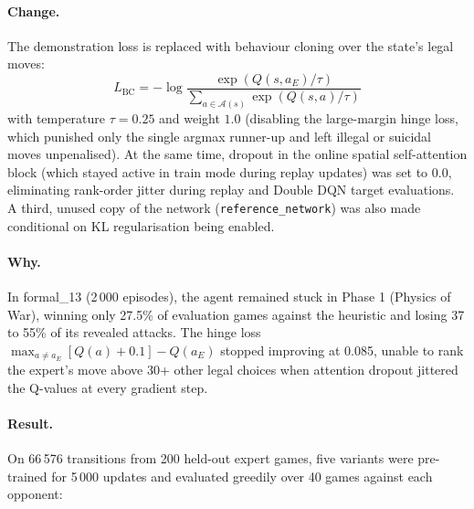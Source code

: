 \paragraph{Change.} The demonstration loss is replaced with behaviour cloning over the state's
legal moves:
\[
L_{\text{BC}} = -\log \frac{\exp(Q(s, a_E) / \tau)}{\sum_{a \in \mathcal{A}(s)} \exp(Q(s, a) / \tau)}
\]
with temperature $\tau = 0.25$ and weight $1.0$ (disabling the large-margin hinge loss, which
punished only the single argmax runner-up and left illegal or suicidal moves unpenalised). At the
same time, dropout in the online spatial self-attention block (which stayed active in train mode
during replay updates) was set to $0.0$, eliminating rank-order jitter during replay and Double DQN
target evaluations. A third, unused copy of the network (\texttt{reference\_network}) was also made
conditional on KL regularisation being enabled.

\paragraph{Why.} In formal\_13 (2\,000 episodes), the agent remained stuck in Phase 1 (Physics of
War), winning only 27.5\% of evaluation games against the heuristic and losing 37 to 55\% of its
revealed attacks. The hinge loss \(\max_{a \neq a_E}[Q(a) + 0.1] - Q(a_E)\) stopped improving at
0.085, unable to rank the expert's move above 30+ other legal choices when attention dropout jittered
the Q-values at every gradient step.

\paragraph{Result.} On 66\,576 transitions from 200 held-out expert games, five variants were
pre-trained for 5\,000 updates and evaluated greedily over 40 games against each opponent:

